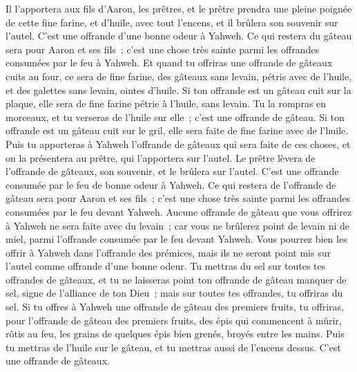 \begin{multicols}{2}
Il l'apportera aux fils d'Aaron, les prêtres, et le prêtre prendra une pleine poignée de cette fine farine, et d'huile, avec tout l'encens, et il brûlera son souvenir sur l'autel. C'est une offrande d'une bonne odeur à Yahweh.
Ce qui restera du gâteau sera pour Aaron et ses fils~; c'est une chose très sainte parmi les offrandes consumées par le feu à Yahweh.
Et quand tu offriras une offrande de gâteaux cuits au four, ce sera de fine farine, des gâteaux sans levain, pétris avec de l'huile, et des galettes sans levain, ointes d'huile.
Si ton offrande est un gâteau cuit sur la plaque, elle sera de fine farine pétrie à l'huile, sans levain.
Tu la rompras en morceaux, et tu verseras de l'huile sur elle~; c'est une offrande de gâteau.
Si ton offrande est un gâteau cuit sur le gril, elle sera faite de fine farine avec de l'huile.
Puis tu apporteras à Yahweh l'offrande de gâteaux qui sera faite de ces choses, et on la présentera au prêtre, qui l'apportera sur l'autel.
Le prêtre lèvera de l'offrande de gâteaux, son souvenir, et le brûlera sur l'autel. C'est une offrande consumée par le feu de bonne odeur à Yahweh.
Ce qui restera de l'offrande de gâteau sera pour Aaron et ses fils~; c'est une chose très sainte parmi les offrandes consumées par le feu devant Yahweh.
Aucune offrande de gâteau que vous offrirez à Yahweh ne sera faite avec du levain~; car vous ne brûlerez point de levain ni de miel, parmi l'offrande consumée par le feu devant Yahweh.
Vous pourrez bien les offrir à Yahweh dans l'offrande des prémices, mais ils ne seront point mis sur l'autel comme offrande d'une bonne odeur.
Tu mettras du sel sur toutes tes offrandes de gâteaux, et tu ne laisseras point ton offrande de gâteau manquer de sel, signe de l'alliance de ton Dieu~; mais sur toutes tes offrandes, tu offriras du sel.
Si tu offres à Yahweh une offrande de gâteau des premiers fruits, tu offriras, pour l'offrande de gâteau des premiers fruits, des épis qui commencent à mûrir, rôtis au feu, les grains de quelques épis bien grenés, broyés entre les mains.
Puis tu mettras de l'huile sur le gâteau, et tu mettras aussi de l'encens dessus. C'est une offrande de gâteaux.

\end{multicols}
